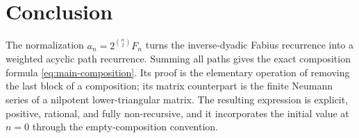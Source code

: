 \documentclass[11pt]{article}
\theoremstyle{definition}
\theoremstyle{remark}
\begin{document}
\section{Conclusion}

The normalization $a_n=2^{\binom n2}F_n$ turns the inverse-dyadic Fabius
recurrence into a weighted acyclic path recurrence.  Summing all paths gives
the exact composition formula \eqref{eq:main-composition}.  Its proof is the
elementary operation of removing the last block of a composition; its matrix
counterpart is the finite Neumann series of a nilpotent lower-triangular
matrix.  The resulting expression is explicit, positive, rational, and
fully non-recursive, and it incorporates the initial value at $n=0$ through
the empty-composition convention.
\end{document}

